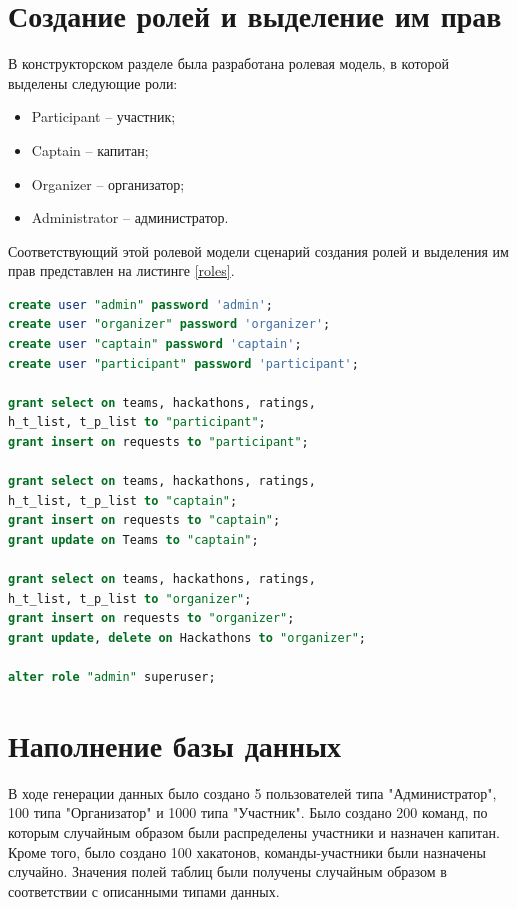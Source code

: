 \section{Создание ролей и выделение им прав}

В конструкторском разделе была разработана ролевая модель, в которой выделены следующие роли:
\begin{itemize}
	\item Participant -- участник;
	\item Captain -- капитан;
	\item Organizer -- организатор;
    \item Administrator -- администратор.
\end{itemize}

Соответствующий этой ролевой модели сценарий создания ролей и выделения им прав представлен на листинге \ref{roles}.

\captionsetup{singlelinecheck = false, justification=raggedright}
\begin{lstlisting}[language=sql, caption=Создание ролей и выделение им прав, label=roles]
create user "admin" password 'admin';
create user "organizer" password 'organizer';
create user "captain" password 'captain';
create user "participant" password 'participant';

grant select on teams, hackathons, ratings, 
h_t_list, t_p_list to "participant";
grant insert on requests to "participant";

grant select on teams, hackathons, ratings, 
h_t_list, t_p_list to "captain";
grant insert on requests to "captain";
grant update on Teams to "captain";

grant select on teams, hackathons, ratings, 
h_t_list, t_p_list to "organizer";
grant insert on requests to "organizer";
grant update, delete on Hackathons to "organizer";

alter role "admin" superuser;
\end{lstlisting}
\captionsetup{singlelinecheck = false, justification=centering}

\section{Наполнение базы данных}

В ходе генерации данных было создано 5 пользователей типа "Администратор", 100 типа "Организатор" и 1000 типа "Участник". Было создано 200 команд, по которым случайным образом были распределены участники и назначен капитан. Кроме того, было создано 100 хакатонов, команды-участники были назначены случайно. Значения полей таблиц были получены случайным образом в соответствии с описанными типами данных. 

